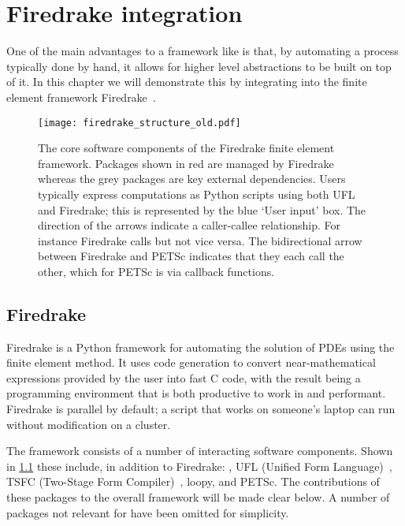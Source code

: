 \documentclass[thesis]{subfiles}
\begin{document}
\chapter{Firedrake integration}
\label{chapter:firedrake}

One of the main advantages to a framework like  is that, by automating a process typically done by hand, it allows for higher level abstractions to be built on top of it.
In this chapter we will demonstrate this by integrating  into the finite element framework Firedrake~\cite{FiredrakeUserManual}.

\begin{figure}
  \texttt{[image: firedrake\_structure\_old.pdf]}
  \caption{
    The core software components of the Firedrake finite element framework.
    Packages shown in red are managed by Firedrake whereas the grey packages are key external dependencies.
    Users typically express computations as Python scripts using both UFL and Firedrake; this is represented by the blue `User input' box.
    The direction of the arrows indicate a caller-callee relationship.
    For instance Firedrake calls  but not vice versa.
    The bidirectional arrow between Firedrake and PETSc indicates that they each call the other, which for PETSc is via callback functions.
  }
  \label{fig:firedrake_structure_old}
\end{figure}

\section{Firedrake}

Firedrake is a Python framework for automating the solution of PDEs using the finite element method.
It uses code generation to convert near-mathematical expressions provided by the user into fast C code, with the result being a programming environment that is both productive to work in and performant.
Firedrake is parallel by default; a script that works on someone's laptop can run without modification on a cluster\footnotemark.


The framework consists of a number of interacting software components.
Shown in \cref{fig:firedrake_structure_old} these include, in addition to Firedrake: , UFL (Unified Form Language)~\cite{alnaesUnifiedFormLanguage2014a}, TSFC (Two-Stage Form Compiler)~\cite{homolyaTSFCStructurePreservingForm2018}, loopy, and PETSc.
The contributions of these packages to the overall framework will be made clear below.
A number of packages not relevant for  have been omitted for simplicity.
\end{document}
